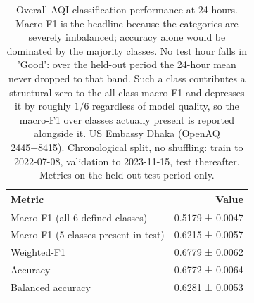 \begin{table}[htbp]
\caption{Overall AQI-classification performance at 24 hours. Macro-F1 is the headline because the categories are severely imbalanced; accuracy alone would be dominated by the majority classes. No test hour falls in 'Good': over the held-out period the 24-hour mean never dropped to that band. Such a class contributes a structural zero to the all-class macro-F1 and depresses it by roughly $1/6$ regardless of model quality, so the macro-F1 over classes actually present is reported alongside it. US Embassy Dhaka (OpenAQ 2445+8415). Chronological split, no shuffling: train to 2022-07-08, validation to 2023-11-15, test thereafter. Metrics on the held-out test period only.}
\label{tab:classification_overall}
\begin{tabular}{lr}
\toprule
Metric & Value \\
\midrule
Macro-F1 (all 6 defined classes) & 0.5179 ± 0.0047 \\
Macro-F1 (5 classes present in test) & 0.6215 ± 0.0057 \\
Weighted-F1 & 0.6779 ± 0.0062 \\
Accuracy & 0.6772 ± 0.0064 \\
Balanced accuracy & 0.6281 ± 0.0053 \\
\bottomrule
\end{tabular}
\end{table}
